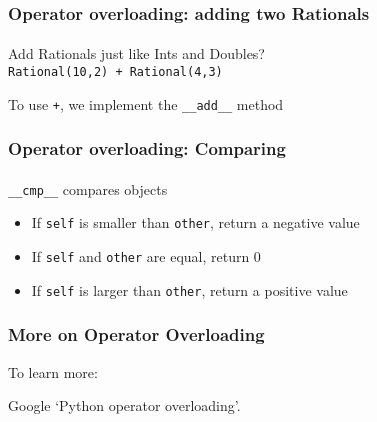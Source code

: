 \begin{frame}[fragile]\frametitle{Operator overloading: adding two Rationals}
    \framesubtitle{}

    Add Rationals just like Ints and Doubles?\\
    \verb|Rational(10,2) + Rational(4,3)|

    To use \texttt{+}, we implement the \texttt{\_\_add\_\_} method

    \vfill

\end{frame}

\begin{frame}[fragile]\frametitle{Operator overloading: Comparing}
    \framesubtitle{}

    \verb|__cmp__| compares objects

    \begin{itemize}
        \item If \texttt{self} is smaller than \texttt{other}, return a negative value
        \item If \texttt{self} and \texttt{other} are equal, return 0
        \item If \texttt{self} is larger than \texttt{other}, return a positive value
    \end{itemize}

\end{frame}

\begin{frame}\frametitle{More on Operator Overloading}

    To learn more:

    \vfill

    Google `Python operator overloading'.

\end{frame}



